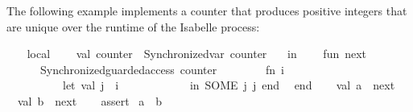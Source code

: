 \begin{isabellebody}
\begin{isamarkuptext}
  \medskip The following example implements a counter that produces
  positive integers that are unique over the runtime of the Isabelle
  process:%
\end{isamarkuptext}%
\isamarkuptrue%
%
\endisatagmlex
{\isafoldmlex}%
%
\isadelimmlex
%
\endisadelimmlex
%
\isadelimML
%
\endisadelimML
%
\isatagML
{}\isamarkupfalse%
\ {\isacharverbatimopen}\isanewline
\ \ local\isanewline
\ \ \ \ val\ counter\ {\isacharequal}\ Synchronized{\isachardot}var\ {\isachardoublequote}counter{\isachardoublequote}\ {}{\isacharsemicolon}\isanewline
\ \ in\isanewline
\ \ \ \ fun\ next\ {\isacharparenleft}{\isacharparenright}\ {\isacharequal}\isanewline
\ \ \ \ \ \ Synchronized{\isachardot}guarded{\isacharunderscore}access\ counter\isanewline
\ \ \ \ \ \ \ \ {\isacharparenleft}fn\ i\ {\isacharequal}{\isachargreater}\isanewline
\ \ \ \ \ \ \ \ \ \ let\ val\ j\ {\isacharequal}\ i\ {\isacharplus}\ {}\isanewline
\ \ \ \ \ \ \ \ \ \ in\ SOME\ {\isacharparenleft}j{\isacharcomma}\ j{\isacharparenright}\ end{\isacharparenright}{\isacharsemicolon}\isanewline
\ \ end{\isacharsemicolon}\isanewline
{\isacharverbatimclose}\isanewline
\isanewline
{}\isamarkupfalse%
\ {\isacharverbatimopen}\isanewline
\ \ val\ a\ {\isacharequal}\ next\ {\isacharparenleft}{\isacharparenright}{\isacharsemicolon}\isanewline
\ \ val\ b\ {\isacharequal}\ next\ {\isacharparenleft}{\isacharparenright}{\isacharsemicolon}\isanewline
\ \ %
\isaantiq
assert%
\endisaantiq
\ {\isacharparenleft}a\ {\isacharless}{\isachargreater}\ b{\isacharparenright}{\isacharsemicolon}\isanewline
{\isacharverbatimclose}%
\endisatagML
{\isafoldML}%
%
\isadelimML
%
\endisadelimML
\isanewline
%
\isadelimtheory
\isanewline
%
\endisadelimtheory
%
\isatagtheory
{}\isamarkupfalse%
%
\endisatagtheory
{\isafoldtheory}%
%
\isadelimtheory
%
\endisadelimtheory
\end{isabellebody}%
